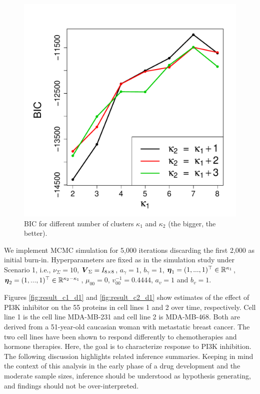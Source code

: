 \begin{figure}[tbp]
\centering
\includegraphics[scale=0.3]{figs_supporting_info/SuppInfo_model_comparison_bic.pdf}
\caption{BIC for different number of clusters $\kappa_1$ and $\kappa_2$ (the bigger, the better).}
\label{fig:bic}
\end{figure}


We implement MCMC simulation for 5,000 iterations discarding the first
2,000 as initial burn-in. Hyperparameters
are fixed as in the simulation study under Scenario 1, i.e.,
$\nu_{\Sigma} = 10$, $\mbox{\boldmath $V$}_{\Sigma}=I_{8\times 8}$,
$a_{\gamma}= 1$, $b_{\gamma}= 1$, $\mbox{\boldmath $\eta$}_1= (1,...,1)^{\top} \in
\mathbb{R}^{\kappa_1}$, $\mbox{\boldmath $\eta$}_2=(1,...,1)^{\top} \in
\mathbb{R}^{\kappa_2 - \kappa_1}$, $\mu_{00}=0$, $v^{-1}_{00}=0.4444$,
$a_v=1$ and $b_v=1$.



Figures \ref{fig:result_c1_d1} and \ref{fig:result_c2_d1}  show
estimates of the effect of PI3K 
inhibitor on the 55 proteins in cell lines 1 and 2 over time,
respectively.
Cell  line 1 is the cell line MDA-MB-231 and cell line 2 is
MDA-MB-468. Both are derived from a 51-year-old caucasian woman with 
metastatic breast cancer. The two cell lines have been shown to
respond differently to chemotherapies and hormone therapies. Here, the
goal is to characterize response to PI3K inhibition. The following discussion highlights related inference
summaries. Keeping in mind the context of this analysis in the
early phase of a drug development and the moderate sample
sizes, inference should be  understood as hypothesis generating, and
findings should not be over-interpreted.

